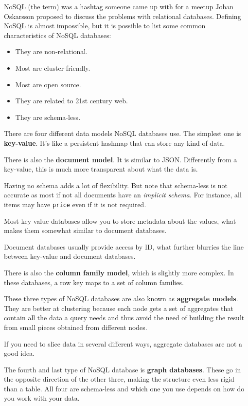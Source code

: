 \documentclass[12pt, oneside]{book}
\begin{document}
NoSQL (the term) was a hashtag someone came up with for a meetup Johan
Oskarsson proposed to discuss the problems with relational databases. Defining
NoSQL is almost impossible, but it is possible to list some common
characteristics of NoSQL databases:
\begin{itemize}
 \item They are non-relational.
 \item Most are cluster-friendly.
 \item Most are open source.
 \item They are related to 21st century web.
 \item They are schema-less.
\end{itemize}

There are four different data models NoSQL databases use.
The simplest one is \textbf{key-value}. It's like a persistent hashmap that can
store any kind of data.

There is also the \textbf{document model}. It is similar to JSON. Differently
from a key-value, this is much more transparent about what the data is.

Having no schema adds a lot of flexibility. But note that schema-less is not
accurate as most if not all documents have an \textit{implicit schema}. For
instance, all items may have \texttt{price} even if it is not required.

Most key-value databases allow you to store metadata about the values, what
makes them somewhat similar to document databases.

Document databases usually provide access by ID, what further blurries the line
between key-value and document databases.

There is also the \textbf{column family model}, which is slightly more complex.
In these databases, a row key maps to a set of column families.

These three types of NoSQL databases are also known as \textbf{aggregate
models}. They are better at clustering because each node gets a set of
aggregates that contain all the data a query needs and thus avoid the need of
building the result from small pieces obtained from different nodes.

If you need to slice data in several different ways, aggregate databases are not
a good idea.

The fourth and last type of NoSQL database is \textbf{graph databases}. These go
in the opposite direction of the other three, making the structure even less
rigid than a table. All four are schema-less and which one you use depends on
how do you work with your data.
\end{document}
